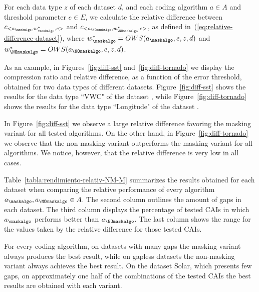 For each data type $z$ of each dataset $d$, and each coding algorithm $a \in A$ and threshold parameter $e \in E$, we calculate the relative difference between $c_{<a_\maskalgo, w_\maskalgo^{*}, e>}$ and $c_{<a_\NOmaskalgo, w_\NOmaskalgo^{*}, e>}$, as defined in~(\ref{eq:relative-difference-dataset}), where $w_\maskalgo^{*}=OWS(a_\maskalgo, e, z, d)$ and $w_\NOmaskalgo^{*}=OWS(a_\NOmaskalgo, e, z, d)$.


\vspace{+2pt}
As an example, in Figures~\ref{fig:diff-sst} and~\ref{fig:diff-tornado} we display the compression ratio and relative difference, as a function of the error threshold, obtained for two data types of different datasets. Figure~\ref{fig:diff-sst} shows the results for the data type ``VWC" of the dataset \datasetsst, while Figure~\ref{fig:diff-tornado} shows the results for the data type ``Longitude" of the dataset \datasettornado.


In Figure~\ref{fig:diff-sst} we observe a large relative difference favoring the masking variant for all tested algorithms. On the other hand, in Figure~\ref{fig:diff-tornado} we observe that the non-masking variant outperforms the masking variant for all algorithms. We notice, however, that the relative difference is very low in all cases.


Table~\ref{tabla:rendimiento-relativ-NM-M} summarizes the results obtained for each dataset when comparing the relative performance of every algorithm $a_\maskalgo, a_\NOmaskalgo \in A$. The second column outlines the amount of gaps in each dataset. The third column displays the percentage of tested CAIs in which $a_\maskalgo$ performs better than $a_\NOmaskalgo$. The last column shows the range for the values taken by the relative difference for those tested CAIs.


\clearpage



\clearpage


\vspace{+0pt}

\vspace{-5pt}


For every coding algorithm, on datasets with many gaps the masking variant always produces the best result, while on gapless datasets the non-masking variant always achieves the best result. On the dataset Solar, which presents few gaps, on approximately one half of the combinations of the tested CAIs the best results are obtained with each variant.


